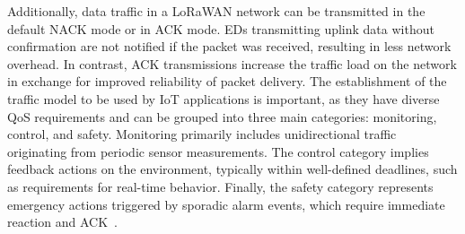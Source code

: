 \documentclass[a4paper,fleqn]{cas-dc}
\begin{document}
Additionally, data traffic in a \gls{LoRaWAN} network can be transmitted in the default \gls{NACK} mode or in \gls{ACK} mode. \gls{EDs} transmitting uplink data without confirmation are not notified if the packet was received, resulting in less network overhead. In contrast, \gls{ACK} transmissions increase the traffic load on the network in exchange for improved reliability of packet delivery. The establishment of the traffic model to be used by \gls{IoT} applications is important, as they have diverse \gls{QoS} requirements and can be grouped into three main categories: monitoring, control, and safety. Monitoring primarily includes unidirectional traffic originating from periodic sensor measurements. The control category implies feedback actions on the environment, typically within well-defined deadlines, such as requirements for real-time behavior. Finally, the safety category represents emergency actions triggered by sporadic alarm events, which require immediate reaction and \gls{ACK}~\cite{carvalho2021lorawan}.
\end{document}
